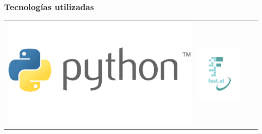 \begin{frame}
  \frametitle{Tecnologías utilizadas}
  \begin{table}[htp]
    \vspace{-.5cm}
      \begin{tabular}{cccc}
        \begin{minipage}{.2\textwidth}
          \includegraphics[width=\textwidth]{imagenes/chapter3/Python}
        \end{minipage} 
                                  & 
        \begin{minipage}{.2\textwidth}
          \includegraphics[width=.9\textwidth]{imagenes/chapter3/FastAI}

\end{minipage}
\end{tabular}
\end{table}
\end{frame}
